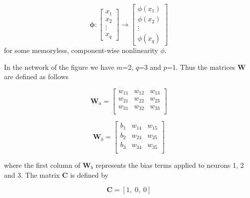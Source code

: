 \begin{enumerate}
\begin{solution}
\begin{enumerate}
      \[
      \boldsymbol{\phi}:
      \left[\begin{array}{c}
          x_1 \\
          x_2 \\
          \vdots \\
          x_q
        \end{array}\right]
      \rightarrow
      \left[\begin{array}{c}
          \phi(x_1) \\
          \phi(x_2) \\
          \vdots \\
          \phi(x_q)
        \end{array}\right]
      \]
      for some memoryless, component-wise nonlinearity $\phi$.

      In the network of the figure we have $m$=2, $q$=3 and $p$=1. Thus the
      matrices $\mathbf{W}$ are defined as follows

      \[
      \mathbf{W}_a = 
      \left[\begin{array}{ccc}
          w_{11} & w_{12} & w_{13} \\
          w_{21} & w_{22} & w_{23} \\
          w_{31} & w_{32} & w_{33} \\
        \end{array}\right]
      \]

      \[
      \mathbf{W}_b = 
      \left[\begin{array}{ccc}
          b_{1} & w_{14} & w_{15} \\
          b_{2} & w_{24} & w_{25} \\
          b_{3} & w_{34} & w_{35} \\
        \end{array}\right]
      \]

      where the first column of $\mathbf{W}_b$ represents the bias terms applied to
      neurons 1, 2 and 3. The matrix $\mathbf{C}$ is defined by

      \[
      \mathbf{C} = [1, \; 0, \; 0]
      \]
    \end{enumerate}
  \end{solution}
  
\end{enumerate}





